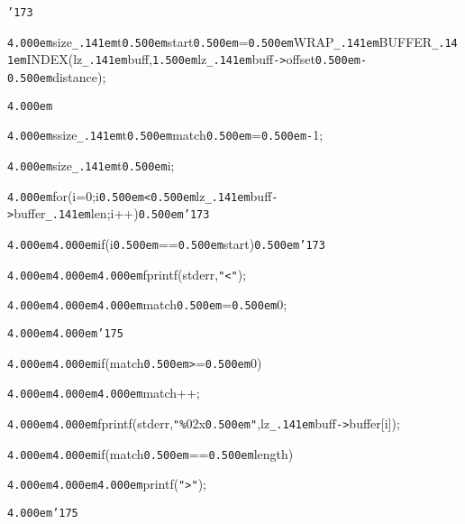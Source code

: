 \noindent
{}{\tt\char'173}

\noindent
{}{\tt\mc \kern4.000em}size{\tt\_\kern.141em}t{\tt\mc \kern0.500em}start{\tt\mc \kern0.500em}={\tt\mc \kern0.500em}WRAP{\tt\_\kern.141em}BUFFER{\tt\_\kern.141em}INDEX(lz{\tt\_\kern.141em}buff,{\tt\mc \kern1.500em}lz{\tt\_\kern.141em}buff{\tt -}{\tt >}offset{\tt\mc \kern0.500em}{\tt -}{\tt\mc \kern0.500em}distance);

\noindent
{}{\tt\mc \kern4.000em}

\noindent
{}{\tt\mc \kern4.000em}ssize{\tt\_\kern.141em}t{\tt\mc \kern0.500em}match{\tt\mc \kern0.500em}={\tt\mc \kern0.500em}{\tt -}1;

\noindent
{}{\tt\mc \kern4.000em}size{\tt\_\kern.141em}t{\tt\mc \kern0.500em}i;

\noindent
{}\hfill

\noindent
{}{\tt\mc \kern4.000em}for(i=0;i{\tt\mc \kern0.500em}{\tt <}{\tt\mc \kern0.500em}lz{\tt\_\kern.141em}buff{\tt -}{\tt >}buffer{\tt\_\kern.141em}len;i++){\tt\mc \kern0.500em}{\tt\char'173}

\noindent
{}{\tt\mc \kern4.000em}{\tt\mc \kern4.000em}if(i{\tt\mc \kern0.500em}=={\tt\mc \kern0.500em}start){\tt\mc \kern0.500em}{\tt\char'173}

\noindent
{}{\tt\mc \kern4.000em}{\tt\mc \kern4.000em}{\tt\mc \kern4.000em}fprintf(stderr,{\tt "}{\tt <}{\tt "});

\noindent
{}{\tt\mc \kern4.000em}{\tt\mc \kern4.000em}{\tt\mc \kern4.000em}match{\tt\mc \kern0.500em}={\tt\mc \kern0.500em}0;

\noindent
{}{\tt\mc \kern4.000em}{\tt\mc \kern4.000em}{\tt\char'175}

\noindent
{}{\tt\mc \kern4.000em}{\tt\mc \kern4.000em}if(match{\tt\mc \kern0.500em}{\tt >}={\tt\mc \kern0.500em}0)

\noindent
{}{\tt\mc \kern4.000em}{\tt\mc \kern4.000em}{\tt\mc \kern4.000em}match++;

\noindent
{}{\tt\mc \kern4.000em}{\tt\mc \kern4.000em}fprintf(stderr,{\tt "}{\tt\%}02x{\tt\mc \kern0.500em}{\tt "},lz{\tt\_\kern.141em}buff{\tt -}{\tt >}buffer[i]);

\noindent
{}{\tt\mc \kern4.000em}{\tt\mc \kern4.000em}if(match{\tt\mc \kern0.500em}=={\tt\mc \kern0.500em}length)

\noindent
{}{\tt\mc \kern4.000em}{\tt\mc \kern4.000em}{\tt\mc \kern4.000em}printf({\tt "}{\tt >}{\tt "});

\noindent
{}{\tt\mc \kern4.000em}{\tt\char'175}

